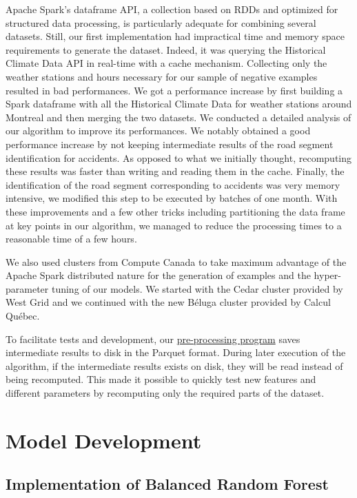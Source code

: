 \documentclass[conference]{IEEEtran}
\begin{document}
Apache Spark's dataframe API, a collection based on RDDs and optimized for 
structured data processing, is particularly adequate for
combining several datasets. Still, our first implementation had impractical
time and memory space requirements to generate the dataset. Indeed, it was querying
the Historical Climate Data API in real-time with a cache mechanism.
Collecting only the weather stations and hours necessary for our
sample of negative examples resulted in bad performances. We got a
performance increase by first building a Spark dataframe with all the
Historical Climate Data for weather stations around Montreal and then
merging the two datasets. We conducted a detailed analysis of our algorithm
to improve its performances. We notably obtained a good performance
increase by not keeping intermediate results of the road segment
identification for accidents. As opposed to what we initially thought,
recomputing these results was faster than writing and reading them in the
cache. Finally, the identification of the road segment corresponding to
accidents was very memory intensive, we modified this step to be executed
by batches of one month. With these improvements and a few other tricks
including partitioning the data frame at key points in our algorithm, we
managed to reduce the processing times to a reasonable time of a few hours.

We also used clusters from Compute Canada to take maximum advantage of the Apache Spark distributed nature for the generation of examples and the hyper-parameter tuning of our models. We started with the Cedar cluster provided by West Grid and we continued with the new B\'eluga cluster provided by Calcul Québec.

To facilitate tests and development, our \href{https://github.com/big-data-lab-team/accident-prediction-montreal/blob/master/preprocess.py}{pre-processing program} saves intermediate results to disk in the Parquet format. During later execution of the algorithm, if the intermediate results exists on disk, they will be read instead of being recomputed. This made it possible to quickly test new features and different parameters by recomputing only the required parts of the dataset.

\section{Model Development}
\label{sec:modeldev}

\subsection{Implementation of Balanced Random Forest}
\end{document}
